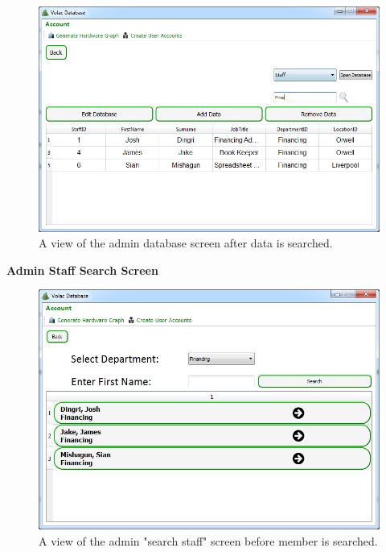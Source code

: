 \begin{figure}[H]
    \includegraphics[width=\textwidth]{./Evaluation/Images/afteradminsearch.png}
    \caption{A view of the admin database screen after data is searched.} 
\end{figure}

\textbf{Admin Staff Search Screen}

\begin{figure}[H]
    \includegraphics[width=\textwidth]{./Evaluation/Images/beforeadv.png}
    \caption{A view of the admin "search staff" screen before member is searched.} 
\end{figure}

